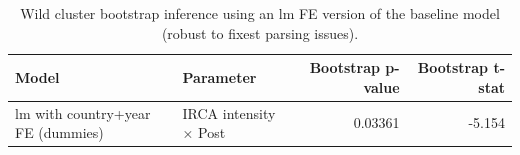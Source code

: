 \begin{table}

\caption{Wild cluster bootstrap inference using an lm FE version of the baseline model (robust to fixest parsing issues).}
\centering
\begin{tabular}[t]{llrr}
\toprule
Model & Parameter & Bootstrap p-value & Bootstrap t-stat\\
\midrule
lm with country+year FE (dummies) & IRCA intensity × Post & 0.03361 & -5.154\\
\bottomrule
\end{tabular}
\end{table}
